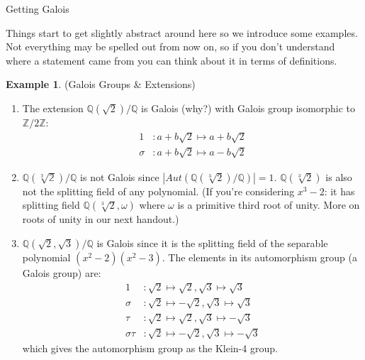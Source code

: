 \documentclass[12pt]{article}
\theoremstyle{definition}
\theoremstyle{definition}
\newtheorem{example}{Example}[section]
\theoremstyle{definition}
\theoremstyle{definition}
\theoremstyle{definition}
\theoremstyle{definition}
\begin{document}
\begin{section}{Getting Galois}
    
    Things start to get slightly abstract around here so we introduce some examples. Not everything may be spelled out from now on, so if you don't understand 
    where a statement came from you can think about it in terms of definitions.
    \begin{example}{(Galois Groups \& Extensions)}
        \begin{enumerate}
            \item The extension \(\mathbb{Q}(\sqrt{2})/\mathbb{Q}\) is Galois (why?) with Galois group isomorphic to \(\mathbb{Z}/2\mathbb{Z}\):
            \begin{align*}
                1 &: a+b\sqrt{2} \mapsto a+b\sqrt{2}\\
                \sigma &: a+b\sqrt{2} \mapsto a-b\sqrt{2}
            \end{align*}

            \item \(\mathbb{Q(\sqrt[3]{2})}/\mathbb{Q}\) is not Galois since \(\left|Aut(\mathbb{Q}(\sqrt[3]{2})/\mathbb{Q})\right| = 1\). \(\mathbb{Q}(\sqrt[3]{2})\)
            is also not the splitting field of any polynomial. (If you're considering \(x^3-2\): it has splitting field \(\mathbb{Q}(\sqrt[3]{2}, \omega)\) where \(\omega\)
            is a primitive third root of unity. More on roots of unity in our next handout.)

            \item \(\mathbb{Q}(\sqrt{2},\sqrt{3})/\mathbb{Q}\) is Galois since it is the splitting field of the separable polynomial \((x^2-2)(x^2-3)\). The elements in its 
            automorphism group (a Galois group) are:
            \begin{align*}
                1 &: \sqrt{2} \mapsto \sqrt{2}, \sqrt{3} \mapsto \sqrt{3}\\
                \sigma &: \sqrt{2} \mapsto -\sqrt{2}, \sqrt{3} \mapsto \sqrt{3}\\
                \tau &: \sqrt{2} \mapsto \sqrt{2}, \sqrt{3} \mapsto -\sqrt{3}\\
                \sigma\tau &: \sqrt{2} \mapsto -\sqrt{2}, \sqrt{3} \mapsto -\sqrt{3}
            \end{align*}
            which gives the automorphism group as the Klein-4 group.
        \end{enumerate}
    \end{example}
\end{section}

\newpage
\end{document}
